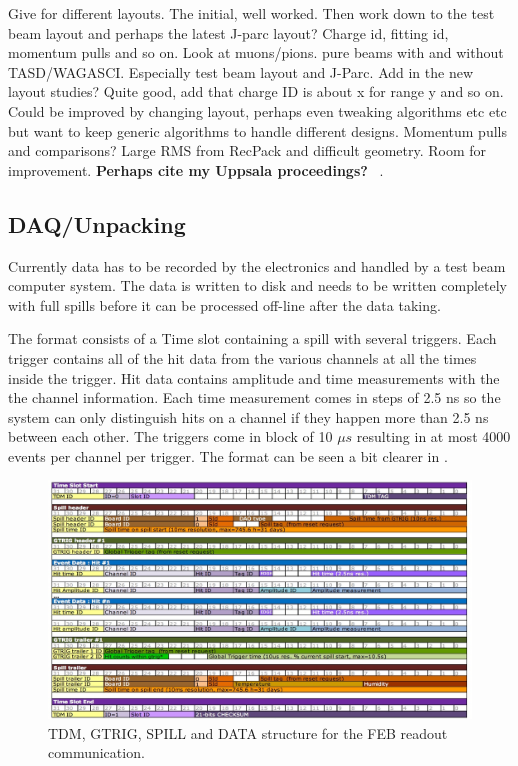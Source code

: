 Give for different layouts. The initial, well worked. Then work down to the test beam layout and perhaps the latest J-parc layout? 
Charge id, fitting id, momentum pulls and so on.
Look at muons/pions. pure beams with and without TASD/WAGASCI. Especially test beam layout and J-Parc.
Add in the new layout studies?
Quite good, add that charge ID is about x for range y and so on.  Could be improved by changing layout, perhaps even tweaking algorithms etc etc but want to keep generic algorithms to handle different designs.
Momentum pulls and comparisons? Large RMS from RecPack and difficult geometry. Room for improvement.
\textbf{Perhaps cite my Uppsala proceedings?} ~\cite{82Uppsala}.
\fi

\subsection{DAQ/Unpacking}


Currently data has to be recorded by the electronics and handled by a test beam computer system. The data is written to disk and needs to be written completely with full spills before it can be processed off-line after the data taking.

The format consists of a Time slot containing a spill with several triggers. Each trigger contains all of the hit data from the various channels at all the times inside the trigger. Hit data contains amplitude and time measurements with the the channel information.
Each time measurement comes in steps of 2.5 ns so the system can only distinguish hits on a channel if they happen more than 2.5 ns between each other. The triggers come in block of 10 $\mu s$ resulting in at most 4000 events per channel per trigger. The format can be seen a bit clearer in .


\begin{figure}[h!]
\centering
\includegraphics[width=\textwidth]{figures/febstructure.jpeg}
\caption{TDM, GTRIG, SPILL and DATA structure for the FEB readout communication.}
\label{fig:FEBstructure}
\end{figure}

